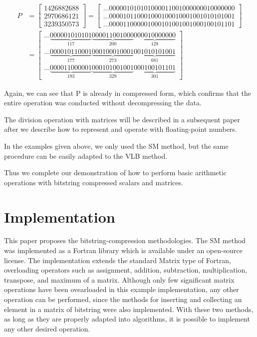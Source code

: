 \documentclass[10pt]{article}
\begin{document}
\begin{align}
	P &= \begin{bmatrix}
			1426882688\\ 
			2970686121\\ 
			3239350573
		\end{bmatrix} 
        =
        \begin{bmatrix}
   			\ldots000001010101000011001000000010000000 \\
			\ldots000010110001000100010001001010101001\\
			\ldots000011000001000101001001000100101101
		\end{bmatrix}
      \\ \nonumber
        &=        \begin{bmatrix}
\ldots\underbrace{000001010101}_{117}\underbrace{000011001000}_{200}\underbrace{
000010000000}_{128}\\
\ldots\underbrace{000010110001}_{177}\underbrace{000100010001}_{273}\underbrace{
001010101001}_{681}\\
\ldots\underbrace{000011000001}_{193}\underbrace{000101001001}_{329}\underbrace{
000100101101}_{301} 			 
        \end{bmatrix}
\end{align}

Again, we can see that P is already in compressed form, which confirms that the
entire operation was conducted without decompressing the data.

The division operation with matrices will be described in a subsequent paper
after we describe how to represent and operate with floating-point numbers.

In the examples given above, we only used the SM method, but the same procedure
can be easily adapted to the VLB method.

Thus we complete our demonstration of how to perform basic arithmetic
operations with bitstring compressed scalars and matrices.

\section{Implementation}

This paper proposes the bitstring-compression methodologies. The SM 
method was implemented as a Fortran library which is available under an 
open-source license. The 
implementation extends the standard Matrix type of Fortran, overloading 
operators such as assignment, addition, subtraction, multiplication, transpose, 
and maximum of a matrix. 
Although only few significant matrix operations have been ovearloaded in this 
example implementation, any other operation can be performed, since 
the methods for inserting and collecting an element in a matrix of bitstring 
were also implemented. With these two methods, as long as they are properly 
adapted into algorithms, it is possible to implement any other desired 
operation.
\end{document}

